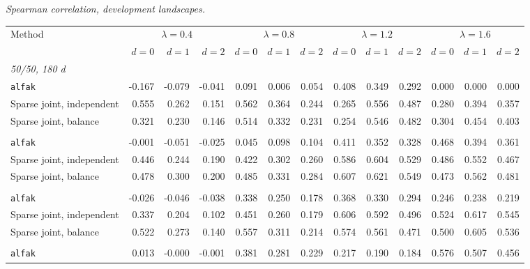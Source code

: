 \noindent\textit{Spearman correlation, development landscapes.}
\begin{center}
\scriptsize
\setlength{\tabcolsep}{2.5pt}
\begin{tabular}{l*{12}{r}}
\toprule
Method & \multicolumn{3}{c}{$\lambda=0.4$} & \multicolumn{3}{c}{$\lambda=0.8$} & \multicolumn{3}{c}{$\lambda=1.2$} & \multicolumn{3}{c}{$\lambda=1.6$} \\
\cmidrule(lr){2-4}\cmidrule(lr){5-7}\cmidrule(lr){8-10}\cmidrule(lr){11-13}
 & $d=0$ & $d=1$ & $d=2$ & $d=0$ & $d=1$ & $d=2$ & $d=0$ & $d=1$ & $d=2$ & $d=0$ & $d=1$ & $d=2$ \\
\midrule
\multicolumn{13}{l}{\textit{50/50, 180 d}} \\
\quad \texttt{alfak} & -0.167 & -0.079 & -0.041 & 0.091 & 0.006 & 0.054 & 0.408 & 0.349 & 0.292 & 0.000 & 0.000 & 0.000 \\
\quad Sparse joint, independent & 0.555 & 0.262 & 0.151 & 0.562 & 0.364 & 0.244 & 0.265 & 0.556 & 0.487 & 0.280 & 0.394 & 0.357 \\
\quad Sparse joint, balance & 0.321 & 0.230 & 0.146 & 0.514 & 0.332 & 0.231 & 0.254 & 0.546 & 0.482 & 0.304 & 0.454 & 0.403 \\
\addlinespace[2pt]
\multicolumn{13}{l}{\textit{200/200, 180 d}} \\
\quad \texttt{alfak} & -0.001 & -0.051 & -0.025 & 0.045 & 0.098 & 0.104 & 0.411 & 0.352 & 0.328 & 0.468 & 0.394 & 0.361 \\
\quad Sparse joint, independent & 0.446 & 0.244 & 0.190 & 0.422 & 0.302 & 0.260 & 0.586 & 0.604 & 0.529 & 0.486 & 0.552 & 0.467 \\
\quad Sparse joint, balance & 0.478 & 0.300 & 0.200 & 0.485 & 0.331 & 0.284 & 0.607 & 0.621 & 0.549 & 0.473 & 0.562 & 0.481 \\
\addlinespace[2pt]
\multicolumn{13}{l}{\textit{200/200, 360 d}} \\
\quad \texttt{alfak} & -0.026 & -0.046 & -0.038 & 0.338 & 0.250 & 0.178 & 0.368 & 0.330 & 0.294 & 0.246 & 0.238 & 0.219 \\
\quad Sparse joint, independent & 0.337 & 0.204 & 0.102 & 0.451 & 0.260 & 0.179 & 0.606 & 0.592 & 0.496 & 0.524 & 0.617 & 0.545 \\
\quad Sparse joint, balance & 0.522 & 0.273 & 0.140 & 0.557 & 0.311 & 0.214 & 0.574 & 0.561 & 0.471 & 0.500 & 0.605 & 0.536 \\
\addlinespace[2pt]
\multicolumn{13}{l}{\textit{500/700, 360 d}} \\
\quad \texttt{alfak} & 0.013 & -0.000 & -0.001 & 0.381 & 0.281 & 0.229 & 0.217 & 0.190 & 0.184 & 0.576 & 0.507 & 0.456 \\

\end{tabular}
\end{center}
